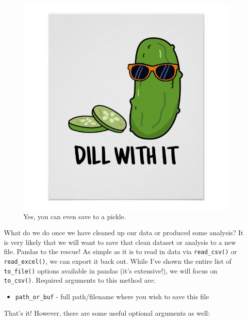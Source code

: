 \documentclass[
  letterpaper,
  DIV=11,
  numbers=noendperiod]{scrreprt}
\providecommand{\tightlist}{%
  \setlength{\itemsep}{0pt}\setlength{\parskip}{0pt}}\usepackage{longtable,booktabs,array}
\begin{document}
\begin{figure}
\begin{minipage}[c]{0.50\linewidth}
{{\includegraphics{./images/getting-data-with-pandas/dill.jpg}

}

\caption{Yes, you can even save to a pickle.}

}

\end{minipage}%

\end{figure}

What do we do once we have cleaned up our data or produced some
analysis? It is very likely that we will want to save that clean dataset
or analysis to a new file. Pandas to the rescue! As simple as it is to
read in data via \texttt{read\_csv()} or \texttt{read\_excel()}, we can
export it back out. While I've shown the entire list of
\texttt{to\_file()} options available in pandas (it's extensive!), we
will focus on \texttt{to\_csv()}. Required arguments to this method are:

\begin{itemize}
\tightlist
\item
  \texttt{path\_or\_buf} - full path/filename where you wish to save
  this file
\end{itemize}

That's it! However, there are some useful optional arguments as well:
\end{document}
